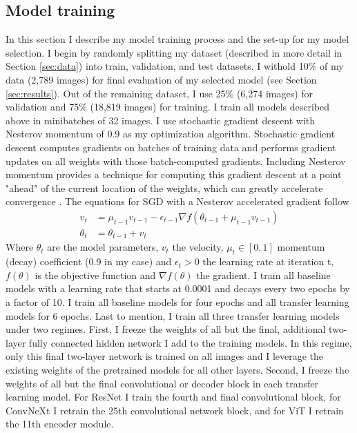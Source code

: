 \documentclass[10pt,twocolumn,letterpaper]{article}
\begin{document}
\subsection{Model training}
\label{sec:model_sel}
In this section I describe my model training process and the set-up for my model selection.
I begin by randomly splitting my dataset (described in more detail in Section \ref{sec:data}) into train, validation, and test datasets. I withold 10\% of my data (2,789 images) for final evaluation of my selected model (see Section \ref{sec:results}). Out of the remaining dataset, I use 25\% (6,274 images) for validation and 75\% (18,819 images) for training.
I train all models described above in minibatches of 32 images. I use stochastic gradient descent with Nesterov momentum of 0.9 as my optimization algorithm. Stochastic gradient descent computes gradients on batches of training data and performs gradient updates on all weights with those batch-computed gradients. Including Nesterov momentum provides a technique for computing this gradient descent at a point "ahead" of the current location of the weights, which can greatly accelerate convergence \cite{nesterov}. The equations for SGD with a Nesterov accelerated gradient follow
\begin{align*}
  v_t &= \mu_{t-1}v_{t-1} - \epsilon_{t-1}\nabla f(\theta_{t-1} + \mu_{t-1}v_{t-1})\\
  \theta_t &= \theta_{t-1} + v_t
\end{align*}
Where $\theta_t$ are the model parameters, $v_t$ the velocity, $\mu_t \in [0,1]$ momentum (decay) coefficient (0.9 in my case) and $\epsilon_t > 0$ the learning rate at iteration t, $f(\theta)$ is the objective function and $\nabla f(\theta)$ the gradient.
I train all baseline models with a learning rate that starts at 0.0001 and decays every two epochs by a factor of 10. I train all baseline models for four epochs and all transfer learning models for 6 epochs.
Last to mention, I train all three transfer learning models under two regimes. First, I freeze the weights of all but the final, additional two-layer fully connected hidden network I add to the training models. In this regime, only this final two-layer network is trained on all images and I leverage the existing weights of the pretrained models for all other layers. 
Second, I freeze the weights of all but the final convolutional or decoder block in each transfer learning model. For ResNet I train the fourth and final convolutional block, for ConvNeXt I retrain the 25th convolutional network block, and for ViT I retrain the 11th encoder module.
\end{document}
